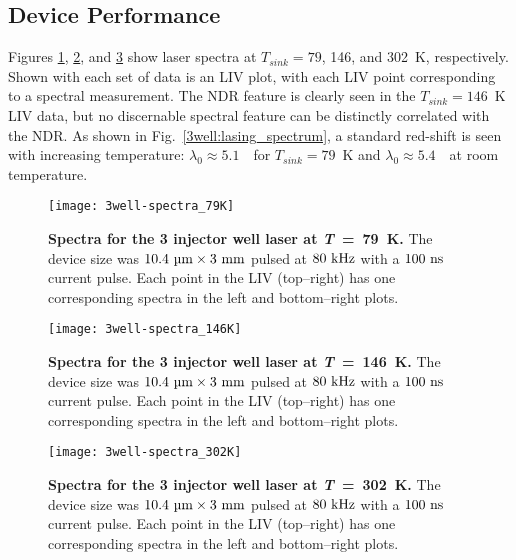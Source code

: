 \subsection{Device Performance}

Figures \ref{3well:spectra_79K}, \ref{3well:spectra_146K}, and \ref{3well:spectra_302K} show laser spectra at $T_{sink}=79$, 146, and 302~K, respectively.  Shown with each set of data is an LIV plot, with each LIV point corresponding to a spectral measurement.  The NDR feature is clearly seen in the $T_{sink}=146$~K LIV data, but no discernable spectral feature can be distinctly correlated with the NDR.  As shown in Fig.~\ref{3well:lasing_spectrum}, a standard red-shift is seen with increasing temperature: $\lambda_0\approx5.1$~\um\ for $T_{sink}=79$~K and $\lambda_0\approx5.4$~\um\ at room temperature.

\begin{figure}[tp]
\centering
\texttt{[image: 3well-spectra\_79K]}
\caption[Spectra for the 3 injector well laser at $T_{sink}=79~\tn{K}$]{\textnormal{\textbf{Spectra for the 3 injector well laser at \textit{T}~=~79~K.}}  The device size was $10.4~\tn{\um} \times 3~\tn{mm}$ pulsed at $80~\textnormal{kHz}$ with a $100~\textnormal{ns}$ current pulse.  Each point in the LIV (top--right) has one corresponding spectra in the left and bottom--right plots.}
\label{3well:spectra_79K}
\end{figure}

\begin{figure}[tp]
\centering
\texttt{[image: 3well-spectra\_146K]}
\caption[Spectra for the 3 injector well laser at $T_{sink}=146~\tn{K}$]{\textnormal{\textbf{Spectra for the 3 injector well laser at \textit{T}~=~146~K.}}  The device size was $10.4~\tn{\um} \times 3~\tn{mm}$ pulsed at $80~\textnormal{kHz}$ with a $100~\textnormal{ns}$ current pulse.  Each point in the LIV (top--right) has one corresponding spectra in the left and bottom--right plots.}
\label{3well:spectra_146K}
\end{figure}

\begin{figure}[tp]
\centering
\texttt{[image: 3well-spectra\_302K]}
\caption[Spectra for the 3 injector well laser at $T_{sink}=302~\tn{K}$]{\textnormal{\textbf{Spectra for the 3 injector well laser at \textit{T}~=~302~K.}}  The device size was $10.4~\tn{\um} \times 3~\tn{mm}$ pulsed at $80~\textnormal{kHz}$ with a $100~\textnormal{ns}$ current pulse.  Each point in the LIV (top--right) has one corresponding spectra in the left and bottom--right plots.}
\label{3well:spectra_302K}
\end{figure}

